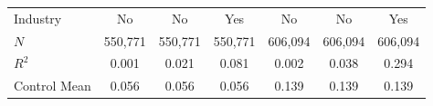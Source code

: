 \documentclass[serif, aspectratio=169]{beamer}
\begin{document}
\begin{frame}
\begin{table}[htbp]
\begin{tabular}{@{}l*{6}{c}@{}}
Industry  &       No         &       No         &      Yes         &       No         &       No         &      Yes         \\
$\textit{N}$&  550,771         &  550,771         &  550,771         &  606,094         &  606,094         &  606,094         \\
$\textit{R}^2$&    0.001         &    0.021         &    0.081         &    0.002         &    0.038         &    0.294         \\
Control Mean&    0.056         &    0.056         &    0.056         &    0.139         &    0.139         &    0.139         \\
\bottomrule
\end{tabular}
\\
\\
\\

\end{table}

\end{frame}





\end{document}
